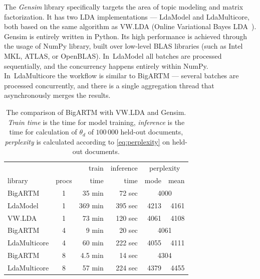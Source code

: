 \documentclass{sig-alternate}
\begin{document}
The \emph{Gensim} library specifically targets the area of topic modeling and matrix factorization.
It has two LDA implementations --- LdaModel and LdaMulticore,
both based on the same algorithm as VW.LDA (Online Variational Bayes LDA~\cite{hoffman10online}).
Gensim is entirely written in Python. Its high performance is achieved through the usage of NumPy library,
built over low-level BLAS libraries (such as Intel MKL, ATLAS, or OpenBLAS).
In~LdaModel all batches are processed sequentially, and the concurrency happens entirely within NumPy. %
In~LdaMulticore the workflow is similar to \mbox{BigARTM} --- several batches are processed concurrently,
and there is a single aggregation thread that asynchronously merges the results.

\begin{table}[t]
	\caption{
        The comparison of BigARTM with VW.LDA and Gensim.
        \emph{Train time} is the time for model training,
        \emph{inference} is the time for calculation of $\theta_d$ of $100\,000$ held-out documents,
        \emph{perplexity} is calculated according to \eqref{eq:perplexity} on held-out documents.
    }
	\label{tab:libraries_comparison}
    \centering\tabcolsep=4.3pt
	\begin{tabular}[t]{l|c|rrrr}
	\hline
	& & train & inference & \multicolumn{2}{c}{perplexity} \\
	library & procs & time & time & mode & mean \\
	\hline
	BigARTM & 1 & 35 min & 72 sec & \multicolumn{2}{c}{4000} \\
	LdaModel & 1 & 369 min & 395 sec & 4213 & 4161  \\
	VW.LDA & 1 & 73 min & 120 sec & 4061 & 4108 \\
	\hline
	BigARTM & 4 & 9 min & 20 sec & \multicolumn{2}{c}{4061}  \\
	LdaMulticore & 4 & 60 min & 222 sec & 4055 & 4111  \\	
	\hline
	BigARTM & 8 & 4.5 min & 14 sec & \multicolumn{2}{c}{4304}  \\
	LdaMulticore & 8 & 57 min & 224 sec & 4379 & 4455 \\
	\hline
	\end{tabular}
\end{table}
\end{document}
